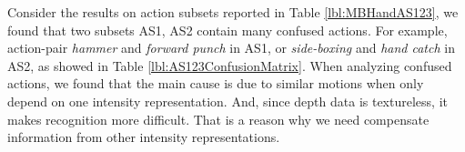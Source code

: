 \documentclass[review]{elsarticle}
\begin{document}
Consider the results on action subsets reported in Table \ref{lbl:MBHandAS123}, we found that two	 subsets AS1, AS2 contain many confused actions. For example, action-pair \textit{hammer} and \textit{forward punch} in AS1, or \textit{side-boxing} and \textit{hand catch} in AS2, as showed in Table \ref{lbl:AS123ConfusionMatrix}. When analyzing confused actions, we found that the main cause is due to similar motions when only depend on one intensity representation. And, since depth data is textureless, it makes recognition more difficult. That is a reason why we need compensate information from other intensity representations.
\begin{table}
	\begin{center}
		

\end{center}
\end{table}
\end{document}
